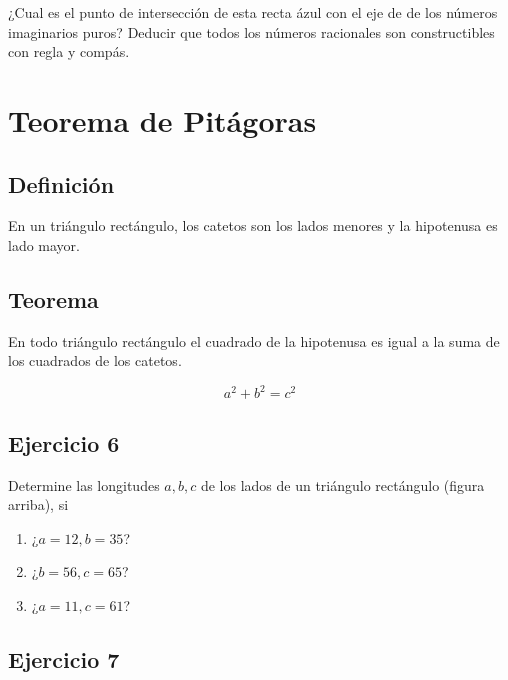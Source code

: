¿Cual es el punto de intersección de esta recta ázul con el eje de 
de los números imaginarios puros? Deducir que todos los números racionales
son constructibles con regla y compás.

\section{Teorema de Pitágoras}

\subsection{Definición}

En un triángulo rectángulo, los catetos son los lados menores y la hipotenusa
es lado mayor.

\subsection{Teorema}

En todo triángulo rectángulo el cuadrado de la hipotenusa es igual a la suma de
los cuadrados de los catetos. 

\begin{center}
\end{center}

$$
a^2 + b^2 = c^2
$$

\subsection{Ejercicio 6}

Determine las longitudes $a,b,c$ de los lados de un triángulo rectángulo
(figura arriba), si

\begin{enumerate}
\item ¿$a = 12, b = 35$?
\item ¿$b = 56, c = 65$?
\item ¿$a = 11, c = 61$?
\end{enumerate}

\subsection{Ejercicio 7}

